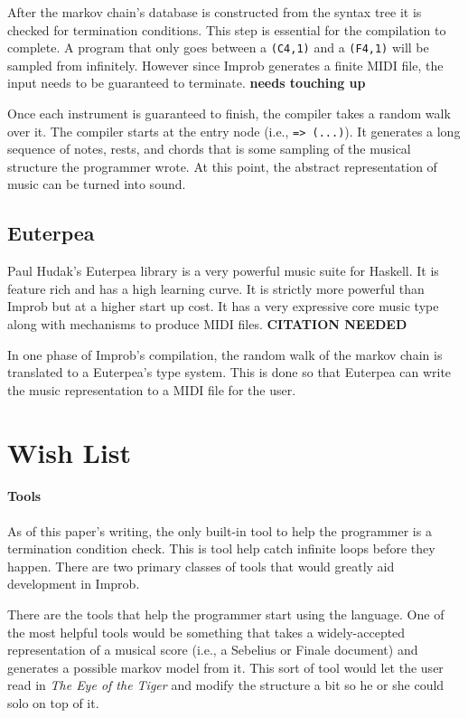 \documentclass[pldi]{sigplanconf-pldi15}
\begin{document}
After the markov chain's database is constructed from the syntax tree it is checked for termination conditions. This step is essential for the compilation to complete. A program that only goes between a \texttt{(C4,1)} and a \texttt{(F4,1)} will be sampled from infinitely. However since Improb generates a finite MIDI file, the input needs to be guaranteed to terminate. \textbf{needs touching up}

Once each instrument is guaranteed to finish, the compiler takes a random walk over it. The compiler starts at the entry node (i.e., \texttt{=> (...)}). It generates a long sequence of notes, rests, and chords that is some sampling of the musical structure the programmer wrote. At this point, the abstract representation of music can be turned into sound.

\subsection{Euterpea}
Paul Hudak's Euterpea library is a very powerful music suite for Haskell. It is feature rich and has a high learning curve. It is strictly more powerful than Improb but at a higher start up cost. It has a very expressive core music type along with mechanisms to produce MIDI files.
\textbf{CITATION NEEDED}

In one phase of Improb's compilation, the random walk of the markov chain is translated to a Euterpea's type system. This is done so that Euterpea can write the music representation to a MIDI file for the user.

\section{Wish List}
\paragraph{Tools}
As of this paper's writing, the only built-in tool to help the programmer is a termination condition check. This is tool help catch infinite loops before they happen. There are two primary classes of tools that would greatly aid development in Improb.

There are the tools that help the programmer start using the language. One of the most helpful tools would be something that takes a widely-accepted representation of a musical score (i.e., a Sebelius or Finale document) and generates a possible markov model from it. This sort of tool would let the user read in \textit{The Eye of the Tiger} and modify the structure a bit so he or she could solo on top of it.
\end{document}
